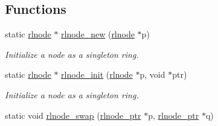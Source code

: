 \subsection*{Functions}
\begin{DoxyCompactItemize}
\item 
static \hyperlink{group__rlists_ga8f6244877f7ce2322c90525217ea6e7a}{rlnode} $\ast$ \hyperlink{group__rlists_gaccdb4bce65952fede472de20297eb36e}{rlnode\+\_\+new} (\hyperlink{group__rlists_ga8f6244877f7ce2322c90525217ea6e7a}{rlnode} $\ast$p)
\begin{DoxyCompactList}\small\item\em Initialize a node as a singleton ring. \end{DoxyCompactList}\item 
static \hyperlink{group__rlists_ga8f6244877f7ce2322c90525217ea6e7a}{rlnode} $\ast$ \hyperlink{group__rlists_ga578e6dc256d4f1580bd8500edf374aca}{rlnode\+\_\+init} (\hyperlink{group__rlists_ga8f6244877f7ce2322c90525217ea6e7a}{rlnode} $\ast$p, void $\ast$ptr)
\begin{DoxyCompactList}\small\item\em Initialize a node as a singleton ring. \end{DoxyCompactList}\item 
static void \hyperlink{group__rlists_ga47c4de39ce6c032dd9fc23c88a883a4b}{rlnode\+\_\+swap} (\hyperlink{group__rlists_gaae2ea9be18d20f0c80a62a2f8e2eed4d}{rlnode\+\_\+ptr} $\ast$p, \hyperlink{group__rlists_gaae2ea9be18d20f0c80a62a2f8e2eed4d}{rlnode\+\_\+ptr} $\ast$q)\hypertarget{group__rlists_ga47c4de39ce6c032dd9fc23c88a883a4b}{}\label{group__rlists_ga47c4de39ce6c032dd9fc23c88a883a4b}


\end{DoxyCompactItemize}
